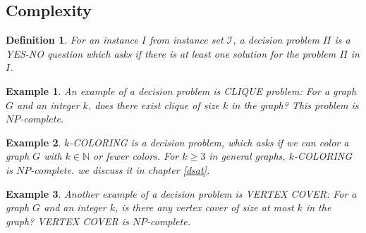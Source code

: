 \documentclass[12pt]{article}
\theoremstyle{slplain}
\newtheorem{defi}{Definition}
\newtheorem{exam}{Example}
\begin{document}
\newpage
\subsection{Complexity}{\label{comp}}

\begin{defi}
For an instance $I$ from instance set $\mathcal{I}$, a decision problem $\Pi$ is a YES-NO question which asks if
there is at least one solution for the problem $\Pi$ in $I$.
\end{defi}

\begin{exam}
An example of a decision problem is CLIQUE problem: For a graph $G$ and an integer $k$, does there exist clique of size $k$ in the graph? This problem is $NP$-complete. \cite{karp}
\end{exam}

\begin{exam}
$k$-COLORING is a decision problem, which asks if we can color a graph $G$ with $k\in\mathbb{N}$ or fewer colors. For $k \geq 3$ in general graphs, $k$-COLORING is $NP$-complete. we discuss it in chapter \ref{dsat}.
\end{exam}

\begin{exam}
Another example of a decision problem is VERTEX COVER: For a graph $G$ and an integer $k$, is there any vertex cover of size at most $k$ in the graph? VERTEX COVER is $NP$-complete. \cite{karp}
\end{exam}
\end{document}
